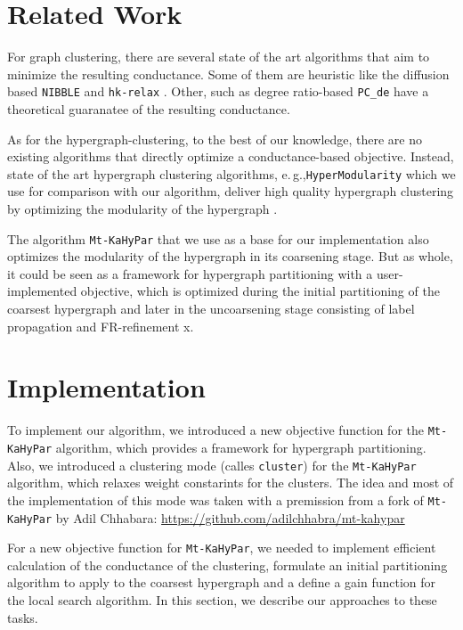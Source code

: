 \documentclass[acmsmall,nonacm,screen,review]{acmart}
\newcommand{\eg}{e.\,g.,\xspace}
\begin{document}
\section{Related Work}
\label{sec:related_work}

For graph clustering, there are several state of the art algorithms 
that aim to minimize the resulting conductance. Some of them are 
heuristic like the diffusion based \texttt{NIBBLE} \cite{Nibble} and 
\texttt{hk-relax} \cite{HKRelax}. Other, such as degree ratio-based 
\texttt{PC\_de} \cite{PCde} have a theoretical guaranatee of the 
resulting conductance. 

As for the hypergraph-clustering, to the best of our knowledge, there 
are no existing algorithms that directly optimize a conductance-based 
objective. Instead, state of the art hypergraph clustering algorithms, 
\eg \texttt{HyperModularity} which we use for comparison with our 
algorithm, deliver high quality hypergraph clustering by optimizing 
the modularity of the hypergraph 
\cite{HyperModularity,ModularityComparison}.

The algorithm \texttt{Mt-KaHyPar} that we use as a base for our 
implementation also optimizes the modularity of the hypergraph in its 
coarsening stage. But as whole, it could be seen as a framework 
for hypergraph partitioning with a user-implemented objective, which 
is optimized during the initial partitioning of the coarsest 
hypergraph and later in the uncoarsening stage consisting of label 
propagation and FR-refinement x\cite{MtKaHyPar2020}.

\section{Implementation}
\label{sec:implementation}

To implement our algorithm, we introduced a new objective function
for the \texttt{Mt-KaHyPar} algorithm, which provides a framework 
for hypergraph partitioning. Also, we introduced a clustering mode
(calles \texttt{cluster}) for the \texttt{Mt-KaHyPar} algorithm, which
relaxes weight constarints for the clusters. The idea and most of the
implementation of this mode was taken with a premission from
a fork of \texttt{Mt-KaHyPar} by Adil Chhabara: 
\hyperlink{https://github.com/adilchhabra/mt-kahypar}
{https://github.com/adilchhabra/mt-kahypar} 

\smallbreak
\noindent For a new objective function for \texttt{Mt-KaHyPar}, we 
needed to implement efficient calculation of the conductance of the 
clustering, formulate an initial partitioning algorithm to apply to 
the coarsest hypergraph and a define a gain function for the local 
search algorithm. In this section, we describe our approaches to
these tasks.
\end{document}
